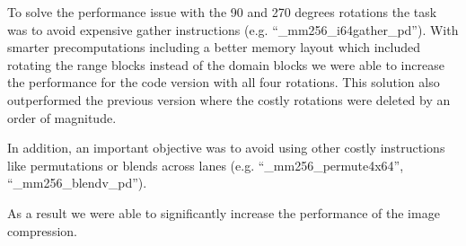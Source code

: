 To solve the performance issue with the 90 and 270 degrees rotations the task
was to avoid expensive gather instructions (e.g. ``\_mm256\_i64gather\_pd'').
With smarter precomputations including a better memory layout which included
rotating the range blocks instead of the domain blocks we were able to increase
the performance for the code version with all four rotations. This solution also
outperformed the previous version where the costly rotations were deleted by an
order of magnitude.

In addition, an important objective was to avoid using other costly instructions
like permutations or blends across lanes (e.g. ``\_mm256\_permute4x64'',
``\_mm256\_blendv\_pd'').

As a result we were able to significantly increase the performance of the image
compression.



